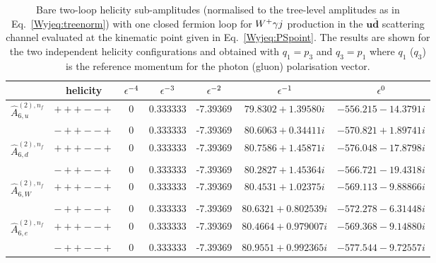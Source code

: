 \documentclass[main.tex]{subfiles}
\begin{document}
\begin{table}[t!]
\centering
\begin{tabularx}{1.0\textwidth}{|C{0.7}|C{1.0}|C{0.6}|C{1.0}|C{1.2}|C{1.2}|C{1.3}|}
\hline
      & helicity & $\epsilon^{-4}$ & $\epsilon^{-3}$ & $\epsilon^{-2}$ & $\epsilon^{-1}$ & $\epsilon^{0}$ \\
\hline
$\hat A^{(2),n_f}_{6,u}$ & $\scriptstyle +++--+$ & 0 & 0.333333 & -7.39369 & $79.8302 + 1.39580 i $ & $-556.215 - 14.3791 i$ \\ 
                     & $\scriptstyle -++--+$ & 0 & 0.333333 & -7.39369 & $80.6063 + 0.34411 i $ & $-570.821 + 1.89741 i$ \\
\hline
$\hat A^{(2),n_f}_{6,d}$ & $\scriptstyle +++--+$ & 0 & 0.333333 & -7.39369 & $80.7586 + 1.45871 i $ & $-576.048 - 17.8798 i$ \\
                     & $\scriptstyle -++--+$ & 0 & 0.333333 & -7.39369 & $80.2827 + 1.45364 i $ & $-566.721 - 19.4318 i$ \\
\hline
$\hat A^{(2),n_f}_{6,W}$ & $\scriptstyle +++--+$ & 0 & 0.333333 & -7.39369 & $80.4531 + 1.02375 i $ & $-569.113 - 9.88866 i$ \\
                     & $\scriptstyle -++--+$ & 0 & 0.333333 & -7.39369 & $80.6321 + 0.802539 i$ & $-572.278 - 6.31448 i$ \\
\hline
$\hat A^{(2),n_f}_{6,e}$ & $\scriptstyle +++--+$ & 0 & 0.333333 & -7.39369 & $80.4664 + 0.979007 i$ & $-569.368 - 9.14880 i$ \\
                     & $\scriptstyle -++--+$ & 0 & 0.333333 & -7.39369 & $80.9551 + 0.992365 i$ & $-577.544 - 9.72557 i$ \\
\hline
\end{tabularx}
\caption{\label{Wyjtab:benchmark2Lnf1bare} 
Bare two-loop helicity sub-amplitudes (normalised to the tree-level amplitudes as in Eq.~\ref{Wyjeq:treenorm}) with one closed fermion loop  
for $W^+\gamma j$ production in the $\mathbf{u\bar{d}}$ scattering channel 
evaluated at the kinematic point given in Eq.~\ref{Wyjeq:PSpoint}. The results are shown for the two independent helicity configurations and obtained with $q_1 = p_3$ and $q_3 = p_1$ where $q_1$ ($q_3$) is the 
reference momentum for the photon (gluon) polarisation vector.
}
\end{table}
%
\end{document}
